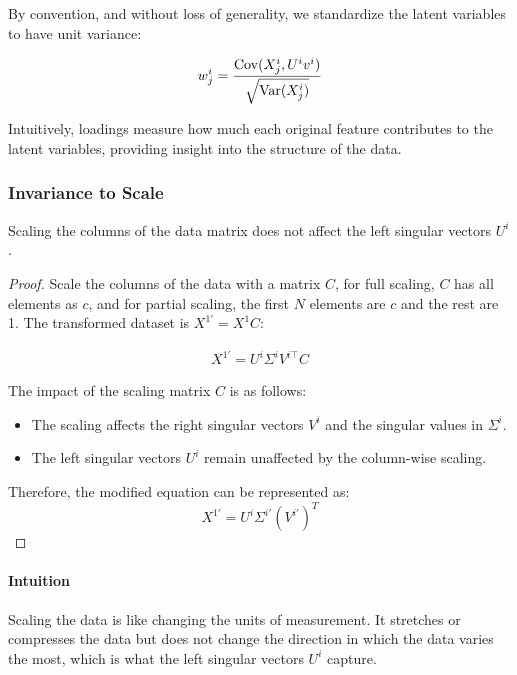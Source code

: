 By convention, and without loss of generality, we standardize the latent variables to have unit variance:

\begin{align}
    w^{i}_j = \frac{\mathrm{Cov}(X^{i}_j, U^{i}v^{i})}{\sqrt{\mathrm{Var}(X^{i}_j)}} \label{eq:standardized_loading}
\end{align}

Intuitively, loadings measure how much each original feature contributes to the latent variables, providing insight into the structure of the data.

\subsubsection{Invariance to Scale}\label{subsubsec:invariance-to-scale}

\begin{lemma}
Scaling the columns of the data matrix does not affect the left singular vectors $U^{i}$.
\end{lemma}

\begin{proof}
Scale the columns of the data with a matrix $C$, for full scaling, \( C \) has all elements as \( c \), and for partial scaling, the first \( N \) elements are \( c \) and the rest are 1. The transformed dataset is \( X^{1'} = X^{1}C \):

\begin{align}
    X^{1'} = U^{i}\Sigma^{i}V^{i\top}C \label{eq:scaled_data}
\end{align}

The impact of the scaling matrix $C$ is as follows:
\begin{itemize}
\item The scaling affects the right singular vectors $V^i$ and the singular values in $\Sigma^i$.
\item The left singular vectors $U^i$ remain unaffected by the column-wise scaling.
\end{itemize}

Therefore, the modified equation can be represented as:
\begin{equation}
X^{1'} = U^i \Sigma^{i'} (V^{i'})^T \label{eq:modified_svd}
\end{equation}
\end{proof}

\paragraph{Intuition}
Scaling the data is like changing the units of measurement. 
It stretches or compresses the data but does not change the direction in which the data varies the most, which is what the left singular vectors $U^i$ capture.


